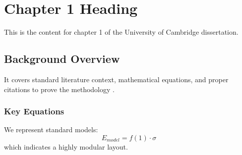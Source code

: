 \chapter{Chapter 1 Heading}
\label{ch:chapter1}
This is the content for chapter 1 of the University of Cambridge dissertation.

\section{Background Overview}
It covers standard literature context, mathematical equations, and proper citations to prove the methodology \cite{texbook}.

\subsection{Key Equations}
We represent standard models:
\begin{equation}
    E_{model} = f(1) \cdot \sigma
\end{equation}
which indicates a highly modular layout.
